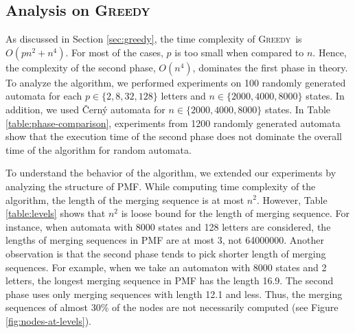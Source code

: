 \documentclass[12pt]{article}
\newcommand{\kkcomm}[1]{{\color{red}{\bf kk: #1}}}
\newcommand{\greedyAlgo}{\textsc{Greedy}}
\begin{document}
\subsection{Analysis on \greedyAlgo}
\label{sec:greedy-analysis}

As discussed in Section \ref{sec:greedy}, the time complexity of \greedyAlgo\ is $O(pn^2 + n^4)$. For most of the cases, $p$ is too small when compared to $n$. Hence, the complexity of the second phase, $O(n^4)$, dominates the first phase in theory. To analyze the algorithm, we performed experiments on 100 randomly generated automata for each  $p \in \{2, 8, 32, 128\}$ letters and  $n \in \{2000, 4000, 8000\}$ states. In addition, we used \v{C}ern\'y automata \kkcomm{we need the definition in the previous section} \cite{cerny} for $n \in \{2000, 4000, 8000\}$ states. In Table \ref{table:phase-comparison}, experiments from 1200 randomly generated automata show that the execution time of the second phase does not dominate the overall time of the algorithm for random automata.

\begin{table}[ht]
	\center
	\caption{Sequential PMF construction time ($t_{PMF}$), and overall time ($t_{ALL}$) in seconds}
	\label{table:phase-comparison}
\end{table}

To understand the behavior of the algorithm, we extended our experiments by analyzing the structure of PMF. While computing time complexity of the algorithm, the length of the merging sequence is at most $n^2$. However, Table \ref{table:levels} shows that $n^2$ is loose bound for the length of merging sequence. For instance, when automata with 8000 states and 128 letters are considered, the lengths of merging sequences in PMF are at most 3, not 64000000. Another observation is that the second phase tends to pick shorter length of merging sequences. For example, when we take an automaton with 8000 states and 2 letters, the longest merging sequence in PMF has the length 16.9. The second phase uses only merging sequences with length 12.1 and less. Thus, the merging sequences of almost 30\% of the nodes are not necessarily computed (see Figure \ref{fig:nodes-at-levels}).
\end{document}
